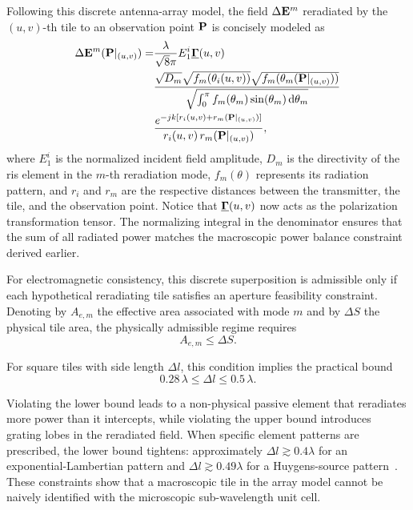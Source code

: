 Following this discrete antenna-array model, the field $\Delta \mathbf{E}^m$ reradiated by the $(u,v)$-th tile to an observation point $\mathbf{P}$ is concisely modeled as~
\begin{equation}
  \begin{split}
    \Delta \mathbf{E}^m(\mathbf{P}|_{(u,v)}) =& \frac{\lambda}{\sqrt{8}\pi} E_{1}^i \underline{\mathbf{\Gamma}}(u,v) \\
    & \frac{\sqrt{D_m} \sqrt{f_m(\theta_i(u,v))} \sqrt{f_m(\theta_m(\mathbf{P}|_{(u,v)}))}}{\sqrt{\int_0^{\pi} f_m(\theta_m) \sin(\theta_m) \, \mathrm{d}\theta_m}} \\
    &\frac{e^{-jk[r_i(u,v) + r_m(\mathbf{P}|_{(u,v)})]}}{r_i(u,v) \, r_m(\mathbf{P}|_{(u,v)})},
  \end{split}
\end{equation}
where $E_{1}^i$ is the normalized incident field amplitude, $D_m$ is the directivity of the \gls{ris} element in the $m$-th reradiation mode, $f_m(\theta)$ represents its radiation pattern, and $r_i$ and $r_m$ are the respective distances between the transmitter, the tile, and the observation point. Notice that $\underline{\mathbf{\Gamma}}(u,v)$ now acts as the polarization transformation tensor. The normalizing integral in the denominator ensures that the sum of all radiated power matches the macroscopic power balance constraint derived earlier.

For electromagnetic consistency, this discrete superposition is admissible only if each hypothetical reradiating tile satisfies an aperture feasibility constraint. Denoting by $A_{e,m}$ the effective area associated with mode $m$ and by $\Delta S$ the physical tile area, the physically admissible regime requires~
\begin{equation}
  A_{e,m} \leq \Delta S.
\end{equation}

For square tiles with side length $\Delta l$, this condition implies the practical bound~
\begin{equation}
  0.28\,\lambda \leq \Delta l \leq 0.5\,\lambda.
\end{equation}

Violating the lower bound leads to a non-physical passive element that reradiates more power than it intercepts, while violating the upper bound introduces grating lobes in the reradiated field. When specific element patterns are prescribed, the lower bound tightens: approximately $\Delta l \gtrsim 0.4\lambda$ for an exponential-Lambertian pattern and $\Delta l \gtrsim 0.49\lambda$ for a Huygens-source pattern~. These constraints show that a macroscopic tile in the array model cannot be naively identified with the microscopic sub-\gls{wavelength} unit cell.

